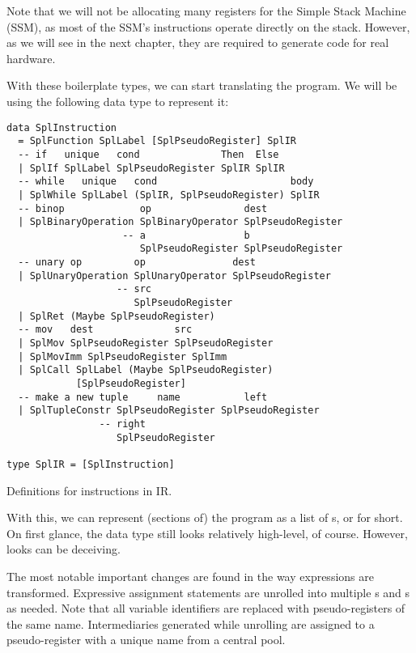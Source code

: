Note that we will not be allocating many registers for the Simple Stack Machine (SSM), as most of the SSM's instructions operate directly on the stack.
However, as we will see in the next chapter, they are required to generate code for real hardware.

With these boilerplate types, we can start translating the program.
We will be using the following data type to represent it:

\begin{listing}
\begin{verbatim}
data SplInstruction
  = SplFunction SplLabel [SplPseudoRegister] SplIR
  -- if   unique   cond              Then  Else
  | SplIf SplLabel SplPseudoRegister SplIR SplIR
  -- while   unique   cond                       body
  | SplWhile SplLabel (SplIR, SplPseudoRegister) SplIR
  -- binop             op                dest
  | SplBinaryOperation SplBinaryOperator SplPseudoRegister
                    -- a                 b
                       SplPseudoRegister SplPseudoRegister
  -- unary op         op               dest
  | SplUnaryOperation SplUnaryOperator SplPseudoRegister
                   -- src
                      SplPseudoRegister
  | SplRet (Maybe SplPseudoRegister)
  -- mov   dest              src
  | SplMov SplPseudoRegister SplPseudoRegister
  | SplMovImm SplPseudoRegister SplImm
  | SplCall SplLabel (Maybe SplPseudoRegister)
            [SplPseudoRegister]
  -- make a new tuple     name           left
  | SplTupleConstr SplPseudoRegister SplPseudoRegister
                -- right
                   SplPseudoRegister

type SplIR = [SplInstruction]
\end{verbatim}
\caption{Definitions for instructions in IR.}
\end{listing}

With this, we can represent (sections of) the program as a list of s, or  for short.
On first glance, the  data type still looks relatively high-level, of course.
However, looks can be deceiving.

The most notable important changes are found in the way expressions are transformed.
Expressive assignment statements are unrolled into multiple s and s as needed.
Note that all variable identifiers are replaced with pseudo-registers of the same name.
Intermediaries generated while unrolling are assigned to a pseudo-register with a unique name from a central pool.

